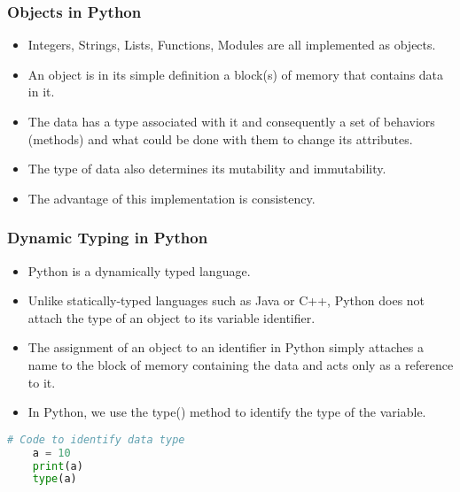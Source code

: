 \documentclass{beamer}
\begin{document}
\begin{frame}
\frametitle{Objects in Python}
\begin{itemize}
\item Integers, Strings, Lists, Functions, Modules are all implemented as objects. 
\item An object is in its simple definition a  block(s) of memory that contains data in it.
\item The data has a type associated with it and consequently a set of behaviors (methods) and what could be done with them to change its attributes.
\item The type of data also determines its mutability and immutability.
\item The advantage of this implementation is consistency.
\end{itemize}
\end{frame}

\begin{frame}[fragile]
\frametitle{Dynamic Typing in Python}
\begin{itemize}
\item Python is a dynamically typed language.
\item Unlike statically-typed languages such as Java or C++, Python does not attach the type of an object to its variable identifier.
\item The assignment of an object to an identifier in Python simply attaches a name to the block of memory containing the data and acts only as a reference to it. 
\item In Python, we use the type() method to identify the type of the variable.
\end{itemize}
\begin{lstlisting}[language=Python, keywordstyle=\color{blue}]
	# Code to identify data type
	a = 10
	print(a)
	type(a)


\end{lstlisting}
\end{frame}
\end{document}
